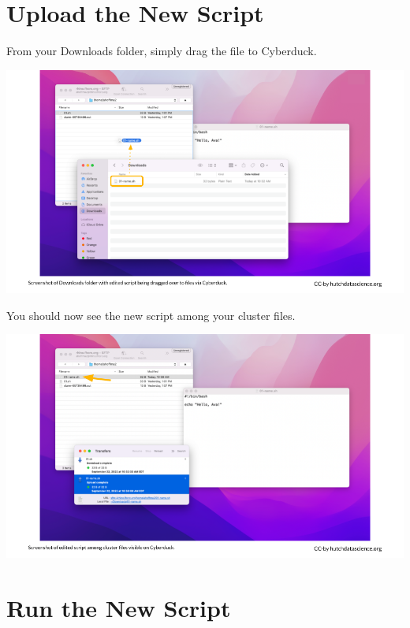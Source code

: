 \documentclass[
]{book}
\begin{document}
\hypertarget{upload-the-new-script}{%
\section{Upload the New Script}\label{upload-the-new-script}}

From your Downloads folder, simply drag the file to Cyberduck.

\includegraphics[width=1\linewidth]{resources/images/06-upload-download_files/figure-latex//1BQxrVYdKZTbpCaF-i_q9w7s9x034lEXpQZDU-Sl09cs_g1579ffd7b01_12_49}

You should now see the new script among your cluster files.

\includegraphics[width=1\linewidth]{resources/images/06-upload-download_files/figure-latex//1BQxrVYdKZTbpCaF-i_q9w7s9x034lEXpQZDU-Sl09cs_g15cf3fa00a4_0_6}

\hypertarget{run-the-new-script}{%
\section{Run the New Script}\label{run-the-new-script}}
\end{document}
